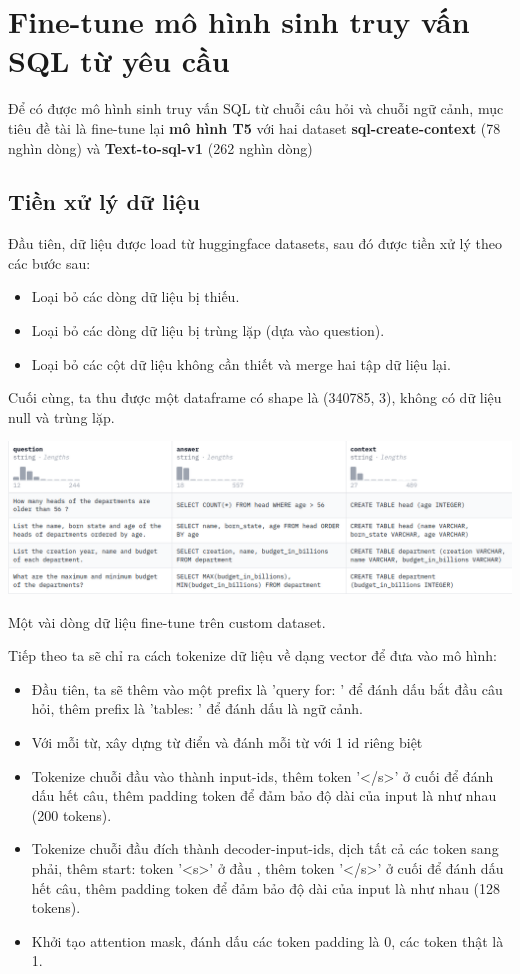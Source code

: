 \documentclass[a4paper, 10pt]{article}
\begin{document}
\section{Fine-tune mô hình sinh truy vấn SQL từ yêu cầu}
Để có được mô hình sinh truy vấn SQL từ chuỗi câu hỏi và chuỗi ngữ cảnh, mục tiêu đề tài là fine-tune lại \textbf{mô hình T5} 
với hai dataset \textbf{sql-create-context} (78 nghìn dòng) và \textbf{Text-to-sql-v1} (262 nghìn dòng)


\subsection{Tiền xử lý dữ liệu}
Đầu tiên, dữ liệu được load từ huggingface datasets, sau đó được tiền xử lý theo các bước sau:
\begin{itemize}
    \item Loại bỏ các dòng dữ liệu bị thiếu.
    \item Loại bỏ các dòng dữ liệu bị trùng lặp (dựa vào question).
    \item Loại bỏ các cột dữ liệu không cần thiết và merge hai tập dữ liệu lại.
\end{itemize}

Cuối cùng, ta thu được một dataframe có shape là (340785, 3), không có dữ liệu null và trùng lặp.

\begin{minipage}{\linewidth}
    \captionsetup{type=figure}
    \centering
    \includegraphics[width=14cm]{./data_head.png}
    \caption{Một vài dòng dữ liệu fine-tune trên custom dataset.}
\end{minipage}

\vspace{0.5cm}
Tiếp theo ta sẽ chỉ ra cách tokenize dữ liệu về dạng vector để đưa vào mô hình:
\begin{itemize}
    \item Đầu tiên, ta sẽ thêm vào một prefix là 'query for: ' để đánh dấu bắt đầu câu hỏi, thêm prefix là 'tables: ' để đánh dấu là ngữ cảnh.
    \item Với mỗi từ, xây dựng từ điển và đánh mỗi từ với 1 id riêng biệt
    \item Tokenize chuỗi đầu vào thành input-ids, thêm token '</s>' ở cuối để đánh dấu hết câu,
     thêm padding token để đảm bảo độ dài của input là như nhau (200 tokens).
    \item Tokenize chuỗi đầu đích thành decoder-input-ids, dịch tất cả các token sang phải, thêm start: token '<s>' ở đầu , 
    thêm token '</s>' ở cuối để đánh dấu hết câu, 
    thêm padding token để đảm bảo độ dài của input là như nhau (128 tokens).
    \item Khởi tạo attention mask, đánh dấu các token padding là 0, các token thật là 1.
\end{itemize}
\end{document}

